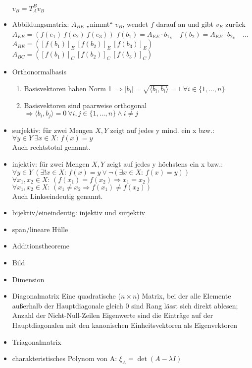 \documentclass[7pt,a4paper]{scrartcl}
\begin{document}
\begin{multicols}{3}
\begin{itemize}
		\subitem $v_B = T_A^B v_B$
	\item Abbildungsmatrix: $A_{BE}$ „nimmt“ $v_B$, wendet $f$ darauf an und gibt $v_E$ zurück
		\subitem $A_{EE}=\left(f(e_1) ~ f(e_2) ~ f(e_3)\right)$
		\subitem $f(b_1)=A_{EE} \cdot b_{1_E} \quad f(b_2)=A_{EE}\cdot b_{2_E} \quad …$ 
		\subitem $A_{BE}=\left([f(b_1)]_E ~ [f(b_2)]_E ~ [f(b_3)]_E\right)$
		\subitem $A_{BC}=\left([f(b_1)]_C ~ [f(b_2)]_C ~ [f(b_3)]_C\right)$
	\item Orthonormalbasis
	\begin{enumerate}
		\item Basisvektoren haben Norm 1 $\Rightarrow |b_{i}|={\sqrt {\langle b_{i},b_{i}\rangle }}=1 ~ \forall i\in\{1,…,n\}$
		\item Basisvektoren sind paarweise orthogonal $\Rightarrow \langle b_{i},b_{j}\rangle =0~\forall i,j \in \{1,…,n\} \wedge i \neq j$
	\end{enumerate}
	\item surjektiv: für zwei Mengen $X, Y$ zeigt auf jedes y mind. ein x bzw.: \\
	$\forall y\in Y\ \exists x\in X\colon \,f(x)=y$ \\
	Auch rechtstotal genannt. 
	\item injektiv: für zwei Mengen $X, Y$ zeigt auf jedes y höchstens ein x bzw.: \\
	$\forall y\in Y\ (\exists !x\in X\colon \,f(x)=y\vee \neg (\exists x\in X\colon \,f(x)=y))$ \\
	$\forall x_{1},x_{2}\in X\colon \,(f(x_{1})=f(x_{2})\Rightarrow x_{1}=x_{2})$ \\
	$\forall x_{1},x_{2}\in X\colon \,(x_{1}\neq x_{2}\Rightarrow f(x_{1})\neq f(x_{2}))$ \\
	Auch Linkseindeutig genannt.
	\item bijektiv/eineindeutig: injektiv und surjektiv
	\item span/lineare Hülle
	\item Additionstheoreme
	\item Bild
	\item Dimension
	\item Diagonalmatrix
		\subitem Eine quadratische ($n \times n$) Matrix, bei der alle Elemente außerhalb der Hauptdiagonale gleich 0 sind
		\subitem Rang lässt sich direkt ablesen; Anzahl der Nicht-Null-Zeilen
		\subitem Eigenwerte sind die Einträge auf der Hauptdiagonalen mit den kanonischen Einheitsvektoren als Eigenvektoren
	\item Triagonalmatrix
	\item charakteristisches Polynom von A: $\xi_A=\det(A-\lambda I)$

\end{itemize}
\end{multicols}
\end{document}
